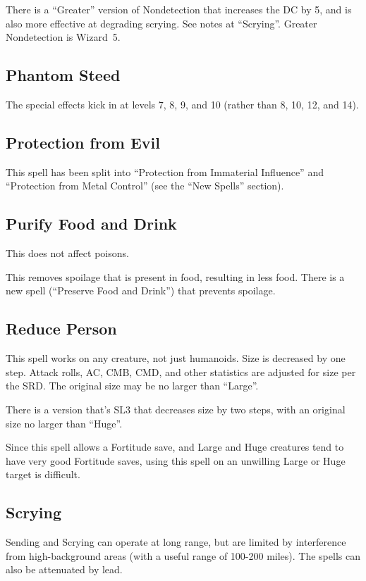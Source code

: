 There is a ``Greater'' version of Nondetection that increases the DC by
5, and is also more effective at degrading scrying. See notes at
``Scrying''. Greater Nondetection is Wizard~5.
%

%
\subsection{Phantom Steed}

The special effects kick in at levels 7, 8, 9, and 10 (rather than 8, 10,
12, and 14).
%

%
\subsection{Protection from Evil}

This spell has been split into ``Protection from Immaterial Influence''
and ``Protection from Metal Control'' (see the ``New Spells'' section).
%

%
\subsection{Purify Food and Drink}

This does not affect poisons.

This removes spoilage that is present in food, resulting in less food.
There is a new spell (``Preserve Food and Drink'') that prevents spoilage.
%

%
\subsection{Reduce Person}

This spell works on any creature, not just humanoids. Size is decreased by
one step. Attack rolls, AC, CMB, CMD, and other statistics are adjusted for
size per the SRD. The original size may be no larger than ``Large''.

There is a version that's SL3 that decreases size by two steps, with an
original size no larger than ``Huge''.

Since this spell allows a Fortitude save, and Large and Huge creatures tend
to have very good Fortitude saves, using this spell on an unwilling Large or
Huge target is difficult.
%

%
\subsection{Scrying}

Sending and Scrying can operate at long range, but are limited by
interference from high-background areas (with a useful range of 100-200
miles). The spells can also be attenuated by lead.

